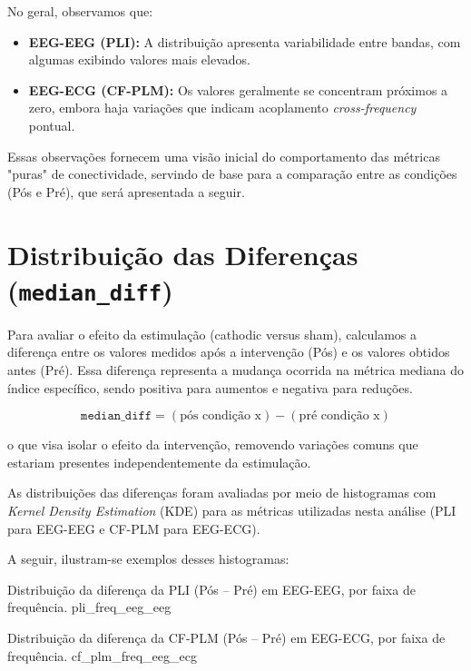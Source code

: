 No geral, observamos que:
\begin{itemize}
    \item \textbf{EEG-EEG (PLI):} A distribuição apresenta variabilidade entre bandas, com algumas exibindo valores mais elevados.
    \item \textbf{EEG-ECG (CF-PLM):} Os valores geralmente se concentram próximos a zero, embora haja variações que indicam acoplamento \emph{cross-frequency} pontual.
\end{itemize}

Essas observações fornecem uma visão inicial do comportamento das métricas "puras" de conectividade, servindo de base para a comparação entre as condições (Pós e Pré), que será apresentada a seguir.

\section{Distribuição das Diferenças (\texttt{median\_diff})}

Para avaliar o efeito da estimulação (cathodic versus sham), calculamos a diferença entre os valores medidos após a intervenção (Pós) e os valores obtidos antes (Pré). Essa diferença representa a mudança ocorrida na métrica mediana do índice específico, sendo positiva para aumentos e negativa para reduções.

\[
\texttt{median\_diff} = (\text{pós condição x}) - (\text{pré condição x})
\]

o que visa isolar o efeito da intervenção, removendo variações comuns que estariam presentes independentemente da estimulação.

As distribuições das diferenças foram avaliadas por meio de histogramas com \emph{Kernel Density Estimation} (KDE) para as métricas utilizadas nesta análise (PLI para EEG-EEG e CF-PLM para EEG-ECG).

A seguir, ilustram-se exemplos desses histogramas:

{Distribuição da diferença da PLI (Pós -- Pré) em EEG-EEG, por faixa de frequência.}
{pli_freq_eeg_eeg}

{Distribuição da diferença da CF-PLM (Pós -- Pré) em EEG-ECG, por faixa de frequência.}
{cf_plm_freq_eeg_ecg}

